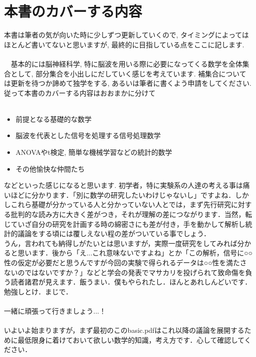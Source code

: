 \documentclass[11pt,a4paper]{ujreport}
\begin{document}
\section{本書のカバーする内容}
本書は筆者の気が向いた時に少しずつ更新していくので, タイミングによってはほとんど書いてないと思いますが, 最終的に目指している点をここに記します.\\
\\
　基本的には脳神経科学, 特に脳波を用いる際に必要になってくる数学を全体集合として, 部分集合を小出しにだしていく感じを考えています. 補集合については更新を待つか諦めて独学をする, あるいは筆者に書くよう申請をしてください. 従って本書のカバーする内容はおおまかに分けて\\
\\
\begin{screen}
\begin{itemize}
 \item 前提となる基礎的な数学
 \item 脳波を代表とした信号を処理する信号処理数学
 \item ANOVAやt検定, 簡単な機械学習などの統計的数学
 \item その他愉快な仲間たち
\end{itemize}
\end{screen}

などといった感じになると思います. 初学者，特に実験系の人達の考える事は痛いほどに分かります．「別に数学の研究したいわけじゃないし」ですよね．しかしこれら基礎が分かっている人と分かっていない人とでは，まず先行研究に対する批判的な読み方に大きく差がつき，それが理解の差につながります．当然，転じていざ自分の研究を計画する時の綿密さにも差が付き，手を動かして解析し統計的議論をする頃には覆しえない程の差がついている事でしょう．\\

うん，言われても納得しがたいとは思いますが，実際一度研究をしてみれば分かると思います．後から「え...これ意味ないですよね」とか「この解析，信号に○○性の仮定が必要だと思うんですが今回の実験で得られるデータは○○性を満たさないのではないですか？」などと学会の発表でマサカリを投げられて致命傷を負う読者諸君が見えます．飯うまい．僕もやられたし．ほんとあれしんどいです．勉強しとけ．まじで．\\
\\

一緒に頑張って行きましょう...！
\\
\\

いよいよ始まりますが，まず最初のこのbasic.pdfはこれ以降の議論を展開するために最低限身に着けておいて欲しい数学的知識，考え方です．心して確認してください．
\end{document}
